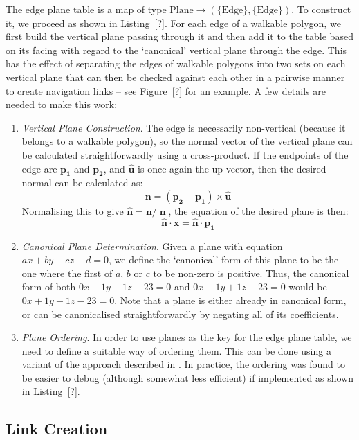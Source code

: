 \documentclass[10pt,twocolumn]{article}
\begin{document}
The edge plane table is a map of type $\mbox{Plane} \to (\{\mbox{Edge}\},\{\mbox{Edge}\})$. To construct it, we proceed as shown in Listing~\ref{?}. For each edge of a walkable polygon, we first build the vertical plane passing through it and then add it to the table based on its facing with regard to the `canonical' vertical plane through the edge. This has the effect of separating the edges of walkable polygons into two sets on each vertical plane that can then be checked against each other in a pairwise manner to create navigation links -- see Figure~\ref{?} for an example. A few details are needed to make this work:
%
\begin{enumerate}

\item \emph{Vertical Plane Construction}. The edge is necessarily non-vertical (because it belongs to a walkable polygon), so the normal vector of the vertical plane can be calculated straightforwardly using a cross-product. If the endpoints of the edge are $\mathbf{p_1}$ and $\mathbf{p_2}$, and $\mathbf{\hat{u}}$ is once again the up vector, then the desired normal can be calculated as:
%
\[
\mathbf{n} = (\mathbf{p_2} - \mathbf{p_1}) \times \mathbf{\hat{u}}
\]
%
Normalising this to give $\mathbf{\hat{n}} = \mathbf{n} / \left|\mathbf{n}\right|$, the equation of the desired plane is then:
%
\[
\mathbf{\hat{n}} \cdot \mathbf{x} = \mathbf{\hat{n}} \cdot \mathbf{p_1}
\]

\item \emph{Canonical Plane Determination}. Given a plane with equation $ax + by + cz - d = 0$, we define the `canonical' form of this plane to be the one where the first of $a$, $b$ or $c$ to be non-zero is positive. Thus, the canonical form of both $0x + 1y - 1z - 23 = 0$ and $0x - 1y + 1z + 23 = 0$ would be $0x + 1y - 1z - 23 = 0$. Note that a plane is either already in canonical form, or can be canonicalised straightforwardly by negating all of its coefficients.

\item \emph{Plane Ordering}. In order to use planes as the key for the edge plane table, we need to define a suitable way of ordering them. This can be done using a variant of the approach described in \cite{salesin92}. In practice, the ordering was found to be easier to debug (although somewhat less efficient) if implemented as shown in Listing~\ref{?}.

\end{enumerate}

\subsection{Link Creation}
\end{document}

